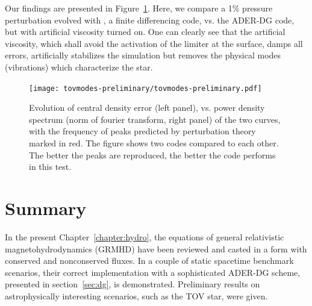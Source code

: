 Our findings are presented in Figure~\ref{fig:tov-preliminary}. Here, we compare a
1\% pressure perturbation evolved with 
\cite{Radice2013,Radice2015},
\ie a finite differencing code, vs. the ADER-DG code, but with artificial viscosity
turned on. One can clearly see that the artificial viscosity, which shall avoid the
activation of the limiter at the surface, damps all errors, artificially stabilizes
the simulation but removes the physical modes (vibrations) which characterize the star.

\begin{figure}[t]
	\texttt{[image: tovmodes-preliminary/tovmodes-preliminary.pdf]}
	\caption[
	  TOV preliminary data \exclusive
	]{Evolution of central density error (left panel), vs. power density
      spectrum (norm of fourier transform, right panel) of the two curves,
      with the frequency of peaks predicted by perturbation theory marked in red.
      The figure shows two codes compared to each other. The better the peaks
      are reproduced, the better the code performs in this test.
     }\label{fig:tov-preliminary}
\end{figure}

\section{Summary}
In the present Chapter~\ref{chapter:hydro}, the equations of general 
relativistic magnetohydrodynamics (GRMHD) have been reviewed and casted in
a form with conserved and nonconserved fluxes. In a couple of static spacetime
benchmark scenarios, their correct implementation with a sophisticated ADER-DG
scheme, presented in section~\ref{sec:dg}, is demonstrated. Preliminary
results on astrophysically interesting scenarios, such as the TOV star,
were given.

